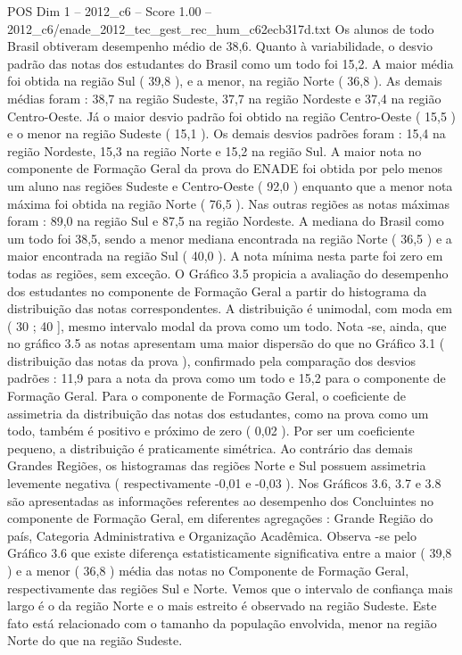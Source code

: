 \begin{textsample}{POS Dim 1 – 2012\_c6 – Score 1.00 – 2012\_c6/enade\_2012\_tec\_gest\_rec\_hum\_c62ecb317d.txt}
Os alunos de todo Brasil obtiveram desempenho médio de 38,6.
Quanto à variabilidade, o desvio padrão das notas dos estudantes do Brasil como um todo foi 15,2.
A maior média foi obtida na região Sul ( 39,8 ), e a menor, na região Norte ( 36,8 ).
As demais médias foram : 38,7 na região Sudeste, 37,7 na região Nordeste e 37,4 na região Centro-Oeste.
Já o maior desvio padrão foi obtido na região Centro-Oeste ( 15,5 ) e o menor na região Sudeste ( 15,1 ).
Os demais desvios padrões foram : 15,4 na região Nordeste, 15,3 na região Norte e 15,2 na região Sul.
A maior nota no componente de Formação Geral da prova do ENADE foi obtida por pelo menos um aluno nas regiões Sudeste e Centro-Oeste ( 92,0 ) enquanto que a menor nota máxima foi obtida na região Norte ( 76,5 ).
Nas outras regiões as notas máximas foram : 89,0 na região Sul e 87,5 na região Nordeste.
A mediana do Brasil como um todo foi 38,5, sendo a menor mediana encontrada na região Norte ( 36,5 ) e a maior encontrada na região Sul ( 40,0 ).
A nota mínima nesta parte foi zero em todas as regiões, sem exceção.
O Gráfico 3.5 propicia a avaliação do desempenho dos estudantes no componente de Formação Geral a partir do histograma da distribuição das notas correspondentes.
A distribuição é unimodal, com moda em ( 30 ; 40 ], mesmo intervalo modal da prova como um todo.
Nota -se, ainda, que no gráfico 3.5 as notas apresentam uma maior dispersão do que no Gráfico 3.1 ( distribuição das notas da prova ), confirmado pela comparação dos desvios padrões : 11,9 para a nota da prova como um todo e 15,2 para o componente de Formação Geral.
Para o componente de Formação Geral, o coeficiente de assimetria da distribuição das notas dos estudantes, como na prova como um todo, também é positivo e próximo de zero ( 0,02 ).
Por ser um coeficiente pequeno, a distribuição é praticamente simétrica.
Ao contrário das demais Grandes Regiões, os histogramas das regiões Norte e Sul possuem assimetria levemente negativa ( respectivamente -0,01 e -0,03 ).
Nos Gráficos 3.6, 3.7 e 3.8 são apresentadas as informações referentes ao desempenho dos Concluintes no componente de Formação Geral, em diferentes agregações : Grande Região do país, Categoria Administrativa e Organização Acadêmica.
Observa -se pelo Gráfico 3.6 que existe diferença estatisticamente significativa entre a maior ( 39,8 ) e a menor ( 36,8 ) média das notas no Componente de Formação Geral, respectivamente das regiões Sul e Norte.
Vemos que o intervalo de confiança mais largo é o da região Norte e o mais estreito é observado na região Sudeste.
Este fato está relacionado com o tamanho da população envolvida, menor na região Norte do que na região Sudeste.

\end{textsample}
